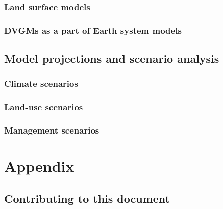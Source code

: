 \documentclass[
  oneside]{book}
\begin{document}

\hypertarget{land-surface-models}{%
\section{Land surface models}\label{land-surface-models}}

\hypertarget{dvgms-as-a-part-of-earth-system-models}{%
\section{DVGMs as a part of Earth system models}\label{dvgms-as-a-part-of-earth-system-models}}

\hypertarget{model-projections-and-scenario-analysis}{%
\chapter{Model projections and scenario analysis}\label{model-projections-and-scenario-analysis}}


\hypertarget{climate-scenarios}{%
\section{Climate scenarios}\label{climate-scenarios}}

\hypertarget{land-use-scenarios}{%
\section{Land-use scenarios}\label{land-use-scenarios}}

\hypertarget{management-scenarios}{%
\section{Management scenarios}\label{management-scenarios}}

\hypertarget{part-appendix}{%
\part{Appendix}\label{part-appendix}}

\hypertarget{contributing-to-this-document}{%
\chapter*{Contributing to this document}\label{contributing-to-this-document}}
\end{document}

